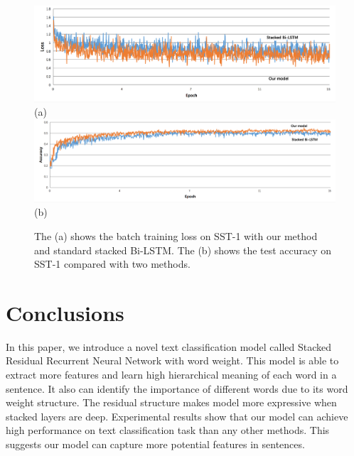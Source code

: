 \documentclass[senior]{IPSstyle}
\begin{document}
\begin{figure}[t]
  \centering
  \includegraphics[width=16cm]{result_1.png}\\
  {(a)}\\
  \includegraphics[width=16cm]{result_2.png}\\
  {(b)}\\
  \caption{The (a) shows the batch training loss on SST-1 with our method and standard stacked Bi-LSTM. The (b) shows the test accuracy on SST-1 compared with two methods.}\label{NBde}
\end{figure}




\chapter{Conclusions}

In this paper, we introduce a novel text classification model called Stacked Residual Recurrent Neural Network with word weight. This model is able to extract more features and learn high hierarchical meaning of each word in a sentence. It also can identify the importance of different words due to its word weight structure. The residual structure makes model more expressive when stacked layers are deep. Experimental results show that our model can achieve high performance on text classification task than any other methods. This suggests our model can capture more potential features in sentences.









\end{document}
